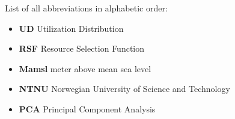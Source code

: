
List of all abbreviations in alphabetic order:

\begin{itemize}
    \item \textbf{UD} Utilization Distribution
    \item \textbf{RSF} Resource Selection Function
    \item \textbf{Mamsl} meter above mean sea level
    \item \textbf{NTNU} Norwegian University of Science and Technology
    \item \textbf{PCA} Principal Component Analysis
    
\end{itemize}